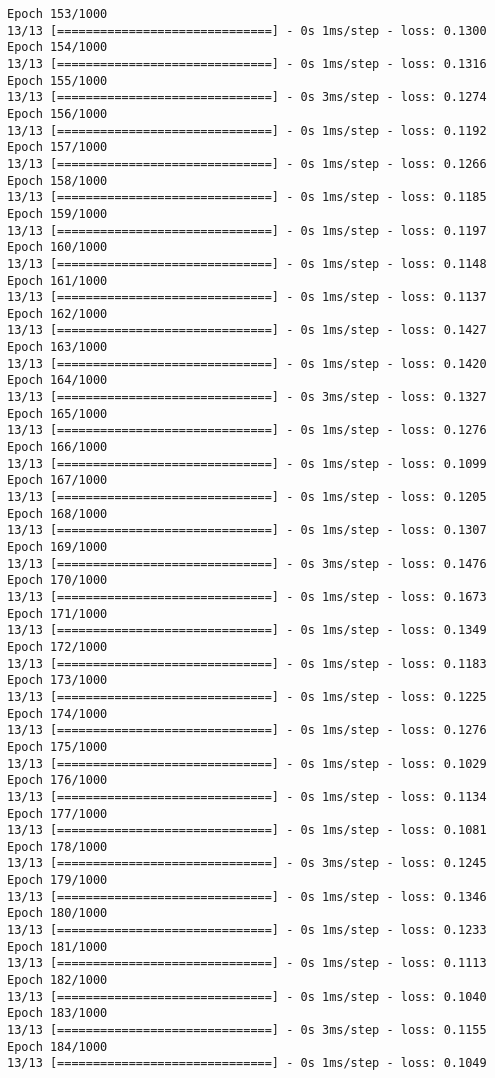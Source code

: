 \documentclass[11pt]{article}
\begin{document}
\begin{Verbatim}[commandchars=\\\{\}]
Epoch 153/1000
13/13 [==============================] - 0s 1ms/step - loss: 0.1300
Epoch 154/1000
13/13 [==============================] - 0s 1ms/step - loss: 0.1316
Epoch 155/1000
13/13 [==============================] - 0s 3ms/step - loss: 0.1274
Epoch 156/1000
13/13 [==============================] - 0s 1ms/step - loss: 0.1192
Epoch 157/1000
13/13 [==============================] - 0s 1ms/step - loss: 0.1266
Epoch 158/1000
13/13 [==============================] - 0s 1ms/step - loss: 0.1185
Epoch 159/1000
13/13 [==============================] - 0s 1ms/step - loss: 0.1197
Epoch 160/1000
13/13 [==============================] - 0s 1ms/step - loss: 0.1148
Epoch 161/1000
13/13 [==============================] - 0s 1ms/step - loss: 0.1137
Epoch 162/1000
13/13 [==============================] - 0s 1ms/step - loss: 0.1427
Epoch 163/1000
13/13 [==============================] - 0s 1ms/step - loss: 0.1420
Epoch 164/1000
13/13 [==============================] - 0s 3ms/step - loss: 0.1327
Epoch 165/1000
13/13 [==============================] - 0s 1ms/step - loss: 0.1276
Epoch 166/1000
13/13 [==============================] - 0s 1ms/step - loss: 0.1099
Epoch 167/1000
13/13 [==============================] - 0s 1ms/step - loss: 0.1205
Epoch 168/1000
13/13 [==============================] - 0s 1ms/step - loss: 0.1307
Epoch 169/1000
13/13 [==============================] - 0s 3ms/step - loss: 0.1476
Epoch 170/1000
13/13 [==============================] - 0s 1ms/step - loss: 0.1673
Epoch 171/1000
13/13 [==============================] - 0s 1ms/step - loss: 0.1349
Epoch 172/1000
13/13 [==============================] - 0s 1ms/step - loss: 0.1183
Epoch 173/1000
13/13 [==============================] - 0s 1ms/step - loss: 0.1225
Epoch 174/1000
13/13 [==============================] - 0s 1ms/step - loss: 0.1276
Epoch 175/1000
13/13 [==============================] - 0s 1ms/step - loss: 0.1029
Epoch 176/1000
13/13 [==============================] - 0s 1ms/step - loss: 0.1134
Epoch 177/1000
13/13 [==============================] - 0s 1ms/step - loss: 0.1081
Epoch 178/1000
13/13 [==============================] - 0s 3ms/step - loss: 0.1245
Epoch 179/1000
13/13 [==============================] - 0s 1ms/step - loss: 0.1346
Epoch 180/1000
13/13 [==============================] - 0s 1ms/step - loss: 0.1233
Epoch 181/1000
13/13 [==============================] - 0s 1ms/step - loss: 0.1113
Epoch 182/1000
13/13 [==============================] - 0s 1ms/step - loss: 0.1040
Epoch 183/1000
13/13 [==============================] - 0s 3ms/step - loss: 0.1155
Epoch 184/1000
13/13 [==============================] - 0s 1ms/step - loss: 0.1049

\end{Verbatim}
\end{document}
